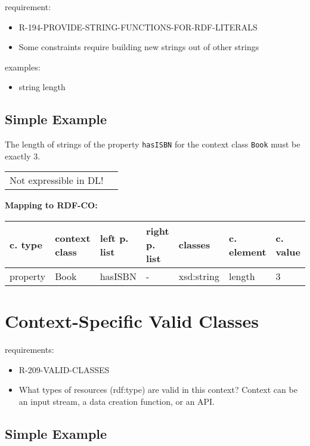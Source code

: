 \documentclass{llncs}
\newcommand{\ms}[1]{\texttt{#1}}
\newenvironment{gcotable}{
  \scriptsize
  \sffamily
  \vspace{0cm}
	\begin{center}
	\textbf{\vspace{0.4cm}Mapping to RDF-CO:} \\
  \begin{tabular}{l|l|l|l|l|l|l}
	\hline
  \textbf{c. type} & \textbf{context class} & \textbf{left p. list} & \textbf{right p. list} & \textbf{classes} & \textbf{c. element} & \textbf{c. value} \\
  \hline

}{
  \hline
  \end{tabular}
	\end{center}
}
\newenvironment{DL}{
  \vspace{0cm}
	\begin{center}
  \begin{tabular}{r l}

}{
  \end{tabular}
	\end{center}
}
\begin{document}
requirement:

\begin{itemize}
	\item R-194-PROVIDE-STRING-FUNCTIONS-FOR-RDF-LITERALS
\end{itemize}

\begin{itemize}
	\item Some constraints require building new strings out of other strings
\end{itemize}

examples:

\begin{itemize}
	\item string length
\end{itemize}

\subsection{Simple Example}

The length of strings of the property \ms{hasISBN} for the context class \ms{Book} must be exactly 3.

\begin{DL}
Not expressible in DL!
\end{DL}

\begin{gcotable}
property & Book & hasISBN & - & xsd:string & length & 3 \\
\end{gcotable}

\section{Context-Specific Valid Classes}

requirements:

\begin{itemize}
	\item R-209-VALID-CLASSES
\end{itemize}

\begin{itemize}
	\item What types of resources (rdf:type) are valid in this context? Context can be an input stream, a data creation function, or an API.
\end{itemize}

\subsection{Simple Example}
\end{document}
